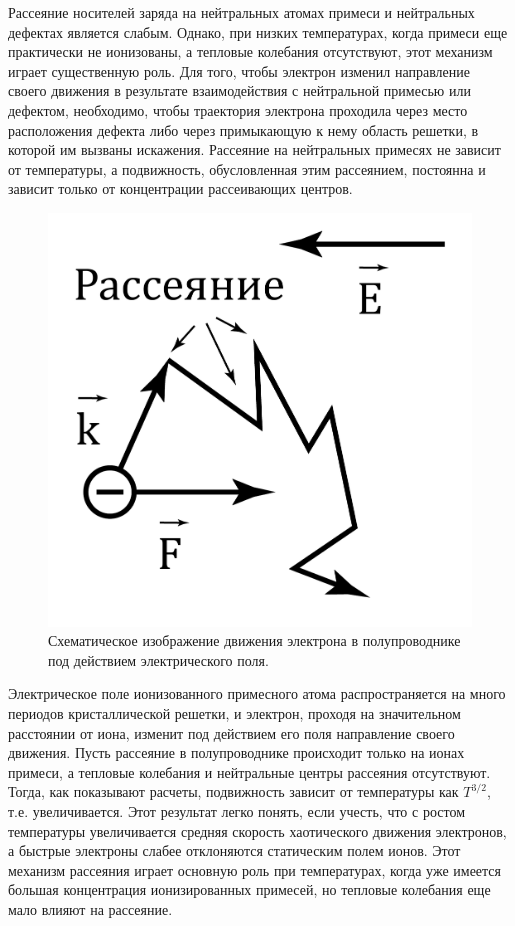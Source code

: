 Рассеяние носителей заряда на нейтральных атомах примеси и нейтральных дефектах является слабым. Однако, при низких
температурах, когда примеси еще практически не ионизованы, а тепловые колебания отсутствуют, этот механизм играет
существенную роль. Для того, чтобы электрон изменил направление своего движения в результате взаимодействия с
нейтральной примесью или дефектом, необходимо, чтобы траектория электрона проходила через место расположения дефекта
либо через примыкающую к нему область решетки, в которой им вызваны искажения. Рассеяние на нейтральных примесях не
зависит от температуры, а подвижность, обусловленная этим рассеянием, постоянна и зависит только от концентрации
рассеивающих центров.
\begin{figure}
	\centering
	\includegraphics[width = .9\linewidth]{img/31}
	\caption{Схематическое изображение движения электрона в полупроводнике под действием электрического поля.}
	\label{fig:3.1}
\end{figure}

Электрическое поле ионизованного примесного атома распространяется на много периодов кристаллической решетки, и
электрон, проходя на значительном расстоянии от иона, изменит под действием его поля направление своего движения. Пусть
рассеяние в полупроводнике происходит только на ионах примеси, а тепловые колебания и нейтральные центры рассеяния
отсутствуют. Тогда, как показывают расчеты, подвижность зависит от температуры как $T^{3/2}$, т.е. увеличивается. Этот
результат легко понять, если учесть, что с ростом температуры увеличивается средняя скорость хаотического движения
электронов, а быстрые электроны слабее отклоняются статическим полем ионов. Этот механизм рассеяния играет основную роль
при температурах, когда уже имеется большая концентрация ионизированных примесей, но тепловые колебания еще мало влияют
на рассеяние. 

